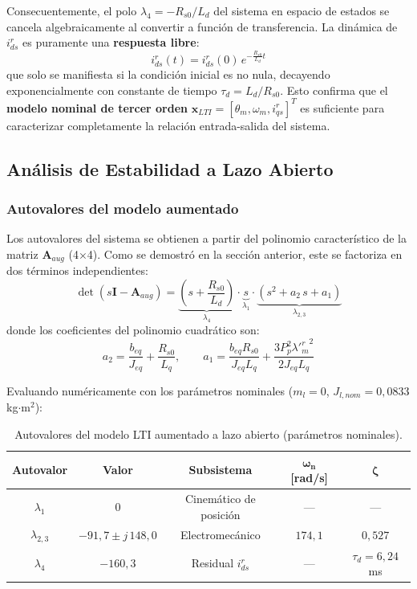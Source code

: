 \documentclass[12pt, a4paper,journal, onecolumn, compsoc]{IEEEtran}
\begin{document}
Consecuentemente, el polo $\lambda_4 = -R_{s0}/L_d$ del sistema en espacio de estados se cancela algebraicamente al convertir a función de transferencia. La dinámica de $i_{ds}^r$ es puramente una \textbf{respuesta libre}:
\begin{equation}
    i_{ds}^r(t) = i_{ds}^r(0) \, e^{-\frac{R_{s0}}{L_d} t}
\end{equation}
que solo se manifiesta si la condición inicial es no nula, decayendo exponencialmente con constante de tiempo $\tau_d = L_d / R_{s0}$. Esto confirma que el \textbf{modelo nominal de tercer orden} $\bm{x}_{LTI} = [\theta_m, \omega_m, i_{qs}^r]^T$ es suficiente para caracterizar completamente la relación entrada-salida del sistema.

\subsection{Análisis de Estabilidad a Lazo Abierto}

\subsubsection{Autovalores del modelo aumentado}
Los autovalores del sistema se obtienen a partir del polinomio característico de la matriz $\bm{A}_{aug}$ (4$\times$4). Como se demostró en la sección anterior, este se factoriza en dos términos independientes:
\begin{equation}
    \det(s\bm{I} - \bm{A}_{aug}) = \underbrace{\left(s + \frac{R_{s0}}{L_d}\right)}_{\lambda_4} \cdot \underbrace{s}_{\lambda_1} \cdot \underbrace{\left(s^2 + a_2\,s + a_1\right)}_{\lambda_{2,3}}
\end{equation}
donde los coeficientes del polinomio cuadrático son:
\begin{equation}
    a_2 = \frac{b_{eq}}{J_{eq}} + \frac{R_{s0}}{L_q}, \qquad a_1 = \frac{b_{eq} R_{s0}}{J_{eq} L_q} + \frac{3 P_p^2 {\lambda'^r_m}^2}{2 J_{eq} L_q}
\end{equation}

Evaluando numéricamente con los parámetros nominales ($m_l = 0$, $J_{l,nom} = 0{,}0833$ kg$\cdot$m$^2$):

\begin{table}[H]
\centering
\caption{Autovalores del modelo LTI aumentado a lazo abierto (parámetros nominales).}
\label{tab:autovalores_LA}
\renewcommand{\arraystretch}{1.4}
\begin{tabular}{|c|c|c|c|c|}
\hline
\textbf{Autovalor} & \textbf{Valor} & \textbf{Subsistema} & $\boldsymbol{\omega_n}$ \textbf{[rad/s]} & $\boldsymbol{\zeta}$ \\
\hline
$\lambda_1$ & $0$ & Cinemático de posición & --- & --- \\
\hline
$\lambda_{2,3}$ & $-91{,}7 \pm j\,148{,}0$ & Electromecánico & $174{,}1$ & $0{,}527$ \\
\hline
$\lambda_4$ & $-160{,}3$ & Residual $i_{ds}^r$ & --- & $\tau_d = 6{,}24$ ms \\
\hline
\end{tabular}
\end{table}
\end{document}
